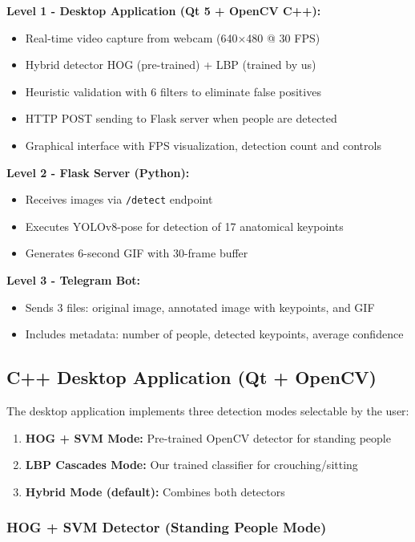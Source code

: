 \documentclass[conference]{IEEEtran}
\begin{document}
\textbf{Level 1 - Desktop Application (Qt 5 + OpenCV C++):}
\begin{itemize}
    \item Real-time video capture from webcam (640×480 @ 30 FPS)
    \item Hybrid detector HOG (pre-trained) + LBP (trained by us)
    \item Heuristic validation with 6 filters to eliminate false positives
    \item HTTP POST sending to Flask server when people are detected
    \item Graphical interface with FPS visualization, detection count and controls
\end{itemize}

\textbf{Level 2 - Flask Server (Python):}
\begin{itemize}
    \item Receives images via \texttt{/detect} endpoint
    \item Executes YOLOv8-pose for detection of 17 anatomical keypoints
    \item Generates 6-second GIF with 30-frame buffer
\end{itemize}

\textbf{Level 3 - Telegram Bot:}
\begin{itemize}
    \item Sends 3 files: original image, annotated image with keypoints, and GIF
    \item Includes metadata: number of people, detected keypoints, average confidence
\end{itemize}

\subsection{C++ Desktop Application (Qt + OpenCV)}

The desktop application implements three detection modes selectable by the user:

\begin{enumerate}
    \item \textbf{HOG + SVM Mode:} Pre-trained OpenCV detector for standing people
    \item \textbf{LBP Cascades Mode:} Our trained classifier for crouching/sitting
    \item \textbf{Hybrid Mode (default):} Combines both detectors
\end{enumerate}

\subsubsection{HOG + SVM Detector (Standing People Mode)}
\end{document}

